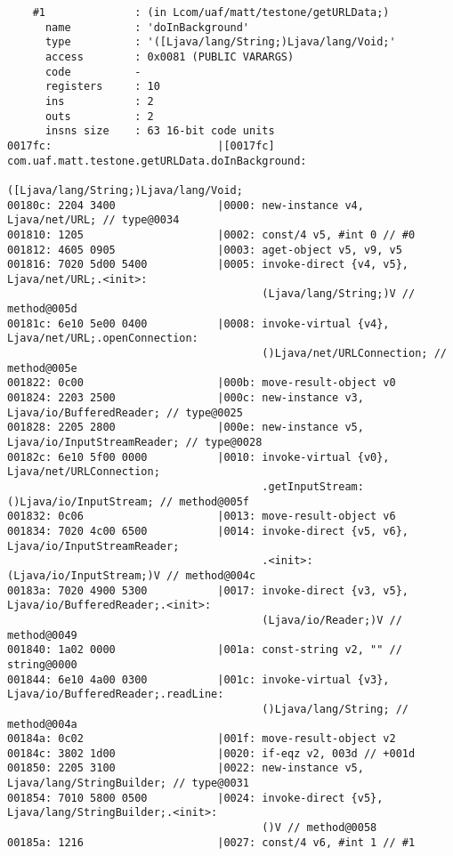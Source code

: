 \begin{lstlisting}
    #1              : (in Lcom/uaf/matt/testone/getURLData;)
      name          : 'doInBackground'
      type          : '([Ljava/lang/String;)Ljava/lang/Void;'
      access        : 0x0081 (PUBLIC VARARGS)
      code          -
      registers     : 10
      ins           : 2
      outs          : 2
      insns size    : 63 16-bit code units
0017fc:                          |[0017fc] com.uaf.matt.testone.getURLData.doInBackground:
                                           ([Ljava/lang/String;)Ljava/lang/Void;
00180c: 2204 3400                |0000: new-instance v4, Ljava/net/URL; // type@0034
001810: 1205                     |0002: const/4 v5, #int 0 // #0
001812: 4605 0905                |0003: aget-object v5, v9, v5
001816: 7020 5d00 5400           |0005: invoke-direct {v4, v5}, Ljava/net/URL;.<init>:
                                        (Ljava/lang/String;)V // method@005d
00181c: 6e10 5e00 0400           |0008: invoke-virtual {v4}, Ljava/net/URL;.openConnection:
                                        ()Ljava/net/URLConnection; // method@005e
001822: 0c00                     |000b: move-result-object v0
001824: 2203 2500                |000c: new-instance v3, Ljava/io/BufferedReader; // type@0025
001828: 2205 2800                |000e: new-instance v5, Ljava/io/InputStreamReader; // type@0028
00182c: 6e10 5f00 0000           |0010: invoke-virtual {v0}, Ljava/net/URLConnection;
                                        .getInputStream:()Ljava/io/InputStream; // method@005f
001832: 0c06                     |0013: move-result-object v6
001834: 7020 4c00 6500           |0014: invoke-direct {v5, v6}, Ljava/io/InputStreamReader;
                                        .<init>:(Ljava/io/InputStream;)V // method@004c
00183a: 7020 4900 5300           |0017: invoke-direct {v3, v5}, Ljava/io/BufferedReader;.<init>:
                                        (Ljava/io/Reader;)V // method@0049
001840: 1a02 0000                |001a: const-string v2, "" // string@0000
001844: 6e10 4a00 0300           |001c: invoke-virtual {v3}, Ljava/io/BufferedReader;.readLine:
                                        ()Ljava/lang/String; // method@004a
00184a: 0c02                     |001f: move-result-object v2
00184c: 3802 1d00                |0020: if-eqz v2, 003d // +001d
001850: 2205 3100                |0022: new-instance v5, Ljava/lang/StringBuilder; // type@0031
001854: 7010 5800 0500           |0024: invoke-direct {v5}, Ljava/lang/StringBuilder;.<init>:
                                        ()V // method@0058
00185a: 1216                     |0027: const/4 v6, #int 1 // #1

\end{lstlisting}
